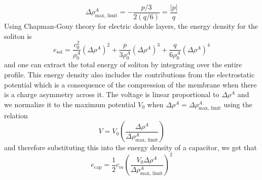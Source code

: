 \documentclass{article}
\numberwithin{equation}{section}
\begin{document}
\begin{equation}
    \Delta \rho^A_{\text{max, limit}} = -\frac{p/3}{2(q/6)} = \frac{|p|}{q}
\end{equation}
Using Chapman-Gouy theory for electric double layers, the energy density for the soliton is 
\begin{equation}
    e_{\text{sol}} = \frac{c_0^2}{\rho_0^A}(\Delta \rho^A)^2 + \frac{p}{3\rho_0^A}(\Delta \rho^A)^3 + \frac{q}{6\rho_0^A}(\Delta \rho^A)^4
\end{equation}
and one can extract the total energy of soliton by integrating over the entire profile. This energy density also includes the contributions from the electrostatic potential which is a consequence of the compression of the membrane when there is a charge asymmetry across it. The voltage is linear proportional to $\Delta \rho^A$ and we normalize it to the maximum potential $V_0$ when $\Delta \rho^A = \Delta \rho^A_{\text{max, limit}}$ using the relation 
\begin{equation*}
    V = V_0\left( \frac{\Delta \rho^A}{\Delta \rho^A_{\text{max, limit}}} \right)
\end{equation*}
and therefore substituting this into the energy density of a capacitor, we get that 
\begin{equation}
    e_{\text{cap}} =\frac{1}{2}c_m\left(\frac{V_0\Delta \rho^A}{\Delta \rho^A_{\text{max, limit}}} \right)^2
\end{equation}

\newpage
\end{document}
